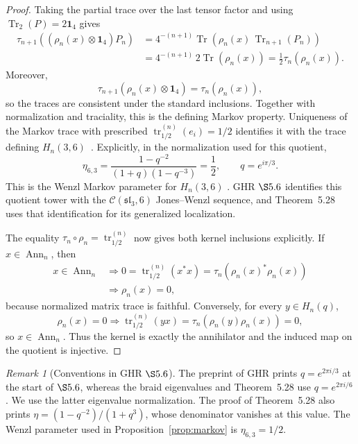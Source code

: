 \documentclass[11pt]{article}
\theoremstyle{remark}
\newtheorem{remark}[theorem]{Remark}
\newcommand{\Id}{\mathbf 1}
\newcommand{\Tr}{\operatorname{Tr}}
\newcommand{\cC}{\mathcal C}
\begin{document}
\begin{proof}
Taking the partial trace over the last tensor factor and using
\(\Tr_2(P)=2\Id_4\) gives
\[
\begin{aligned}
  \tau_{n+1}\!\left((\rho_n(x)\otimes\Id_4)P_n\right)
  &=
  4^{-(n+1)}
  \Tr\!\left(\rho_n(x)\,\Tr_{n+1}(P_n)\right)\\
  &=
  4^{-(n+1)}\,2\Tr(\rho_n(x))
   =\frac12\tau_n(\rho_n(x)).
\end{aligned}
\]
Moreover,
\[
  \tau_{n+1}(\rho_n(x)\otimes\Id_4)=\tau_n(\rho_n(x)),
\]
so the traces are consistent under the standard inclusions.
Together with normalization and traciality, this is the defining Markov
property.  Uniqueness of the Markov trace with prescribed
\(\operatorname{tr}^{(n)}_{1/2}(e_i)=1/2\) identifies it with the trace defining
\(H_n(3,6)\)~\cite[Eq.~(3.2)]{Wenzl1988}.  Explicitly, in the normalization
used for this quotient,
\[
  \eta_{6,3}
  =\frac{1-q^{-2}}{(1+q)(1-q^{-3})}
  =\frac12,
  \qquad q=e^{i\pi/3}.
\]
This is the Wenzl Markov parameter for \(H_n(3,6)\)
\cite[Theorem~3.6(b), p.~379]{Wenzl1988}.  GHR \(\S5.6\) identifies
this quotient tower with the \(\cC(\mathfrak{sl}_3,6)\) Jones--Wenzl sequence,
and Theorem~5.28 uses that identification for its generalized localization.

The equality \(\tau_n\circ\rho_n=\operatorname{tr}^{(n)}_{1/2}\) now gives
both kernel inclusions explicitly.  If \(x\in\operatorname{Ann}_n\), then
\[
\begin{aligned}
  x\in\operatorname{Ann}_n
  &\Longrightarrow
  0=\operatorname{tr}^{(n)}_{1/2}(x^*x)
   =\tau_n\!\left(\rho_n(x)^*\rho_n(x)\right)\\
  &\Longrightarrow \rho_n(x)=0,
\end{aligned}
\]
because normalized matrix trace is faithful.  Conversely, for every
\(y\in H_n(q)\),
\[
  \rho_n(x)=0
  \Longrightarrow
  \operatorname{tr}^{(n)}_{1/2}(yx)
  =\tau_n\!\left(\rho_n(y)\rho_n(x)\right)=0,
\]
so \(x\in\operatorname{Ann}_n\).  Thus the kernel is exactly the annihilator
and the induced map on the quotient is injective.
\end{proof}

\begin{remark}[Conventions in GHR \(\S5.6\)]
The preprint of GHR prints \(q=e^{2\pi i/3}\) at the start of \(\S5.6\),
whereas the braid eigenvalues and
Theorem~5.28 use \(q=e^{2\pi i/6}\).  We use the latter eigenvalue
normalization.  The proof of Theorem~5.28 also prints
\(\eta=(1-q^{-2})/(1+q^3)\), whose denominator vanishes at this value.  The
Wenzl parameter used in Proposition~\ref{prop:markov} is
\(\eta_{6,3}=1/2\).
\end{remark}
\end{document}
